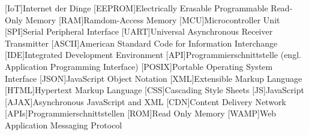 \begin{acronym}[xxxxxxxxx]
  [IoT]{Internet der Dinge}
  [EEPROM]{Electrically Erasable Programmable Read-Only Memory}
  [RAM]{Ramdom-Access Memory}
  [MCU]{Microcontroller Unit}
  [SPI]{Serial Peripheral Interface}
  [UART]{Universal Asynchronous Receiver Transmitter}
  [ASCII]{American Standard Code for Information Interchange}
  [IDE]{Integrated Development Environment}
  [API]{Programmierschnittstelle (engl. Application Programming Interface)}
  [POSIX]{Portable Operating System Interface}
  [JSON]{JavaScript Object Notation}
  [XML]{Extensible Markup Language}
  [HTML]{Hypertext Markup Language}
  [CSS]{Cascading Style Sheets}
  [JS]{JavaScript}
  [AJAX]{Asynchronous JavaScript and XML}
  [CDN]{Content Delivery Network}
  [APIs]{Programmierschnittstellen}
  [ROM]{Read Only Memory}
  [WAMP]{Web Application Messaging Protocol}
  
\end{acronym}

